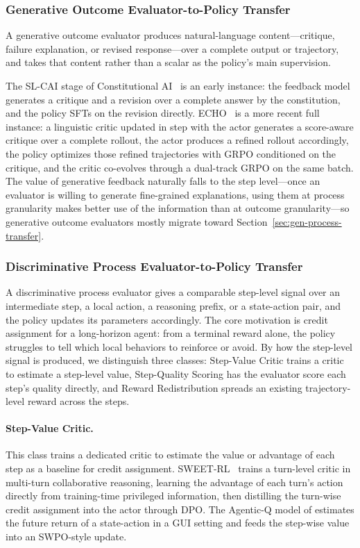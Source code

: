 \subsubsection{Generative Outcome Evaluator-to-Policy Transfer}

A generative outcome evaluator produces natural-language content---critique, failure explanation, or revised response---over a complete output or trajectory, and takes that content rather than a scalar as the policy's main supervision.

The SL-CAI stage of Constitutional AI~\cite{Bai22b} is an early instance: the feedback model generates a critique and a revision over a complete answer by the constitution, and the policy SFTs on the revision directly. ECHO~\cite{Li26l} is a more recent full instance: a linguistic critic updated in step with the actor generates a score-aware critique over a complete rollout, the actor produces a refined rollout accordingly, the policy optimizes those refined trajectories with GRPO conditioned on the critique, and the critic co-evolves through a dual-track GRPO on the same batch. The value of generative feedback naturally falls to the step level---once an evaluator is willing to generate fine-grained explanations, using them at process granularity makes better use of the information than at outcome granularity---so generative outcome evaluators mostly migrate toward Section~\ref{sec:gen-process-transfer}.

\subsubsection{Discriminative Process Evaluator-to-Policy Transfer}
\label{sec:disc-process-transfer}

A discriminative process evaluator gives a comparable step-level signal over an intermediate step, a local action, a reasoning prefix, or a state-action pair, and the policy updates its parameters accordingly. The core motivation is credit assignment for a long-horizon agent: from a terminal reward alone, the policy struggles to tell which local behaviors to reinforce or avoid. By how the step-level signal is produced, we distinguish three classes: Step-Value Critic trains a critic to estimate a step-level value, Step-Quality Scoring has the evaluator score each step's quality directly, and Reward Redistribution spreads an existing trajectory-level reward across the steps.

\paragraph{Step-Value Critic.} This class trains a dedicated critic to estimate the value or advantage of each step as a baseline for credit assignment. SWEET-RL~\cite{Zho25p} trains a turn-level critic in multi-turn collaborative reasoning, learning the advantage of each turn's action directly from training-time privileged information, then distilling the turn-wise credit assignment into the actor through DPO. The Agentic-Q model of \cite{Wan26s} estimates the future return of a state-action in a GUI setting and feeds the step-wise value into an SWPO-style update.


